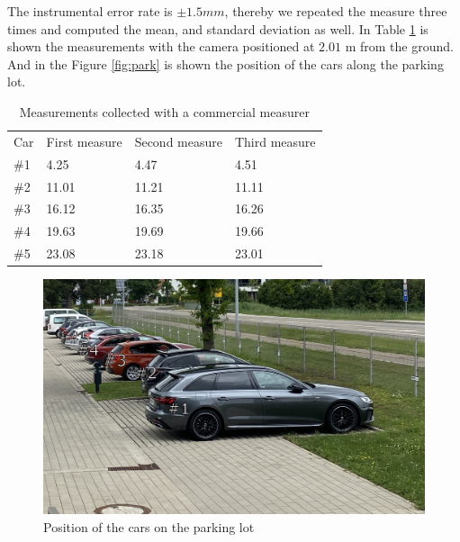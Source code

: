 The instrumental error rate is $\pm 1.5 mm$, thereby we repeated the measure three times and computed the mean, and standard deviation as well. In Table \ref{tab:tab_measure} is shown the measurements with the camera positioned at $2.01$ m from the ground. And in the Figure \ref{fig:park} is shown the position of the cars along the parking lot. 



\begin{table}[H]
\centering
\caption{Measurements collected with a commercial measurer}
\begin{tabular}{l|l|l|l} 
\toprule
Car & First measure & Second measure & Third measure  \\
\#1   & 4.25          & 4.47           & 4.51           \\
\#2   & 11.01         & 11.21          & 11.11          \\
\#3   & 16.12         & 16.35          & 16.26          \\
\#4   & 19.63         & 19.69          & 19.66          \\
\#5   & 23.08         & 23.18          & 23.01          \\
\bottomrule
\end{tabular}
\label{tab:tab_measure}
\end{table} 



\begin{figure}[H]
\centering
\label{fig:park}
\includegraphics[scale=0.5]{imagens/park.JPG}
\caption{Position of the cars on the parking lot}
\label{fig:output}
\end{figure}

